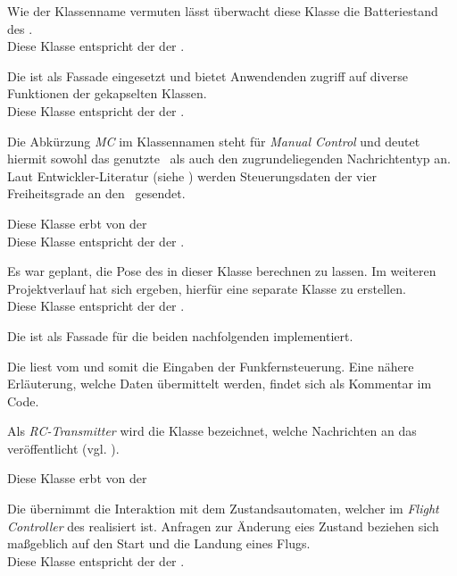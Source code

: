 Wie der Klassenname vermuten lässt überwacht diese Klasse die Batteriestand des \Quad[s].
\\Diese Klasse entspricht der  der \Ar.


Die  ist als Fassade eingesetzt und bietet Anwendenden zugriff auf diverse Funktionen der gekapselten Klassen.
\\Diese Klasse entspricht der  der \Ar.


Die Abkürzung \textit{MC} im Klassennamen steht für \textit{Manual Control} und deutet hiermit sowohl das genutzte \Topic\ als auch den zugrundeliegenden Nachrichtentyp an. Laut Entwickler-Literatur (siehe ) werden Steuerungsdaten der vier Freiheitsgrade an den \Quad\ gesendet. 

Diese Klasse erbt von der 
\\Diese Klasse entspricht der  der \Ar.


Es war geplant, die Pose des \Quad[s] in dieser Klasse berechnen zu lassen. Im weiteren Projektverlauf hat sich ergeben, hierfür eine separate Klasse zu erstellen.
\\Diese Klasse entspricht der  der \Ar.


\clearpage
{}
Die  ist als Fassade für die beiden nachfolgenden implementiert.


\FloatBarrier
{}
Die  liest vom  und somit die Eingaben der Funkfernsteuerung. Eine nähere Erläuterung, welche Daten übermittelt werden, findet sich als Kommentar im Code.


Als \textit{RC-Transmitter} wird die Klasse bezeichnet, welche Nachrichten an das  veröffentlicht (vgl. ).

Diese Klasse erbt von der 


Die  übernimmt die Interaktion mit dem Zustandsautomaten, welcher im \textit{Flight Controller} des \Quad[s] realisiert ist.
Anfragen zur Änderung eies Zustand beziehen sich maßgeblich auf den Start und die Landung eines Flugs.
\\Diese Klasse entspricht der  der \Ar.


